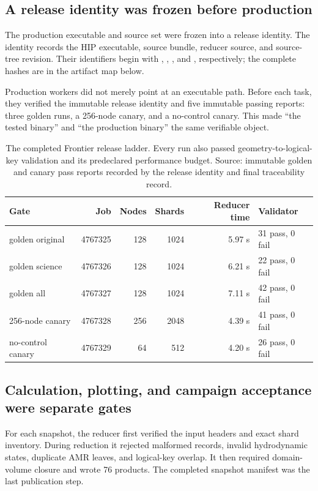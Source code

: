 \documentclass[11pt]{article}
\begin{document}
\subsection{A release identity was frozen before production}

The production executable and source set were frozen into a release identity.
The identity records the HIP executable, source bundle, reducer source, and
source-tree revision. Their identifiers begin with
, ,
, and , respectively; the
complete hashes are in the artifact map below.

Production workers did not merely point at an executable path. Before each
task, they verified the immutable release identity and five immutable passing
reports: three golden runs, a 256-node canary, and a no-control canary. This
made ``the tested binary'' and ``the production binary'' the same verifiable
object.

\begin{table}[ht]
\centering
\small
\begin{tabular}{lrrrrl}
\toprule
Gate & Job & Nodes & Shards & Reducer time & Validator \\
\midrule
golden original & 4767325 & 128 & 1024 & 5.97 s & 31 pass, 0 fail \\
golden science  & 4767326 & 128 & 1024 & 6.21 s & 22 pass, 0 fail \\
golden all      & 4767327 & 128 & 1024 & 7.11 s & 42 pass, 0 fail \\
256-node canary & 4767328 & 256 & 2048 & 4.39 s & 41 pass, 0 fail \\
no-control canary & 4767329 & 64 & 512 & 4.20 s & 26 pass, 0 fail \\
\bottomrule
\end{tabular}
\caption{The completed Frontier release ladder. Every run also passed
geometry-to-logical-key validation and its predeclared performance budget.
Source: immutable golden and canary pass reports recorded by the release
identity and final traceability record.}
\end{table}

\subsection{Calculation, plotting, and campaign acceptance were separate gates}

For each snapshot, the reducer first verified the input headers and exact
shard inventory. During reduction it rejected malformed records, invalid
hydrodynamic states, duplicate AMR leaves, and logical-key overlap. It then
required domain-volume closure and wrote 76 products. The completed snapshot
manifest was the last publication step.
\end{document}
